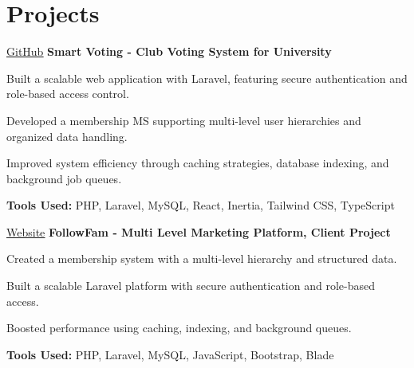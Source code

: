 \section{Projects}

\begin{twocolentry}{
    \underline{\href{https://github.com/rajubeparybd/club-voting}{GitHub}}
}
    \textbf{Smart Voting - Club Voting System for University}\end{twocolentry}

\vspace{0.10 cm}
\begin{onecolentry}
    \begin{highlights}
        \item Built a scalable web application with Laravel, featuring secure authentication and role-based access control.
        \item Developed a membership MS supporting multi-level user hierarchies and organized data handling.
        \item Improved system efficiency through caching strategies, database indexing, and background job queues.
        \item \textbf{Tools Used:} PHP, Laravel, MySQL, React, Inertia, Tailwind CSS, TypeScript
    \end{highlights}
\end{onecolentry}


\vspace{0.2 cm}
\begin{twocolentry}{
    \underline{\href{https://followfam.com}{Website}}
}
    \textbf{FollowFam - Multi Level Marketing Platform, Client Project}\end{twocolentry}

\vspace{0.10 cm}
\begin{onecolentry}
    \begin{highlights}
        \item Created a membership system with a multi-level hierarchy and structured data.
        \item Built a scalable Laravel platform with secure authentication and role-based access.
        \item Boosted performance using caching, indexing, and background queues.
        \item \textbf{Tools Used:} PHP, Laravel, MySQL, JavaScript, Bootstrap, Blade
    \end{highlights}
\end{onecolentry}


